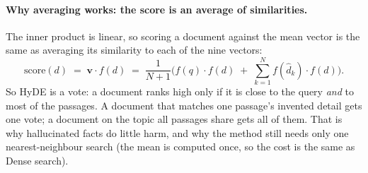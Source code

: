 \documentclass[11pt]{article}
\begin{document}
\paragraph{Why averaging works: the score is an average of similarities.} The inner product is
linear, so scoring a document against the mean vector is the same as averaging its similarity to
each of the nine vectors:
\[
\mathrm{score}(d) \;=\; \mathbf v\cdot f(d) \;=\; \frac{1}{N+1}\Big( f(q)\cdot f(d) \;+\; \sum_{k=1}^{N} f(\hat d_k)\cdot f(d)\Big).
\]
So HyDE is a vote: a document ranks high only if it is close to the query \emph{and} to most of the
passages. A document that matches one passage's invented detail gets one vote; a document on the
topic all passages share gets all of them. That is why hallucinated facts do little harm, and why
the method still needs only one nearest-neighbour search (the mean is computed once, so the cost is
the same as Dense search).
\begin{center}\end{center}
\end{document}
